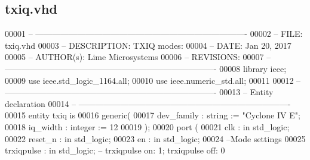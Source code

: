 \subsection{txiq.\+vhd}
\label{txiq_8vhd_source}

\begin{DoxyCode}
00001 \textcolor{keyword}{-- ---------------------------------------------------------------------------- }
00002 \textcolor{keyword}{-- FILE:    txiq.vhd}
00003 \textcolor{keyword}{-- DESCRIPTION: TXIQ modes: }
00004 \textcolor{keyword}{-- DATE:    Jan 20, 2017}
00005 \textcolor{keyword}{-- AUTHOR(s):   Lime Microsystems}
00006 \textcolor{keyword}{-- REVISIONS:}
00007 \textcolor{keyword}{-- ---------------------------------------------------------------------------- }
00008 \textcolor{vhdlkeyword}{library }\textcolor{keywordflow}{ieee};
00009 \textcolor{vhdlkeyword}{use }ieee.std\_logic\_1164.\textcolor{keywordflow}{all};
00010 \textcolor{vhdlkeyword}{use }ieee.numeric\_std.\textcolor{keywordflow}{all};
00011 
00012 \textcolor{keyword}{-- ----------------------------------------------------------------------------}
00013 \textcolor{keyword}{-- Entity declaration}
00014 \textcolor{keyword}{-- ----------------------------------------------------------------------------}
00015 \textcolor{keywordflow}{entity }txiq \textcolor{keywordflow}{is}
00016    \textcolor{keywordflow}{generic}\textcolor{vhdlchar}{(} 
00017       \textcolor{vhdlchar}{dev_family}    \textcolor{vhdlchar}{:} \textcolor{comment}{string} \textcolor{vhdlchar}{:=} \textcolor{keyword}{"Cyclone IV E"};
00018       \textcolor{vhdlchar}{iq_width}      \textcolor{vhdlchar}{:} \textcolor{comment}{integer} \textcolor{vhdlchar}{:=} \textcolor{vhdllogic}{}\textcolor{vhdllogic}{12}
00019    \textcolor{vhdlchar}{)};
00020    \textcolor{keywordflow}{port} \textcolor{vhdlchar}{(}
00021       \textcolor{vhdlchar}{clk}         \textcolor{vhdlchar}{:} \textcolor{keywordflow}{in} \textcolor{comment}{std\_logic};
00022       \textcolor{vhdlchar}{reset_n}     \textcolor{vhdlchar}{:} \textcolor{keywordflow}{in} \textcolor{comment}{std\_logic};
00023       \textcolor{vhdlchar}{en}          \textcolor{vhdlchar}{:} \textcolor{keywordflow}{in} \textcolor{comment}{std\_logic};
00024 \textcolor{keyword}{      --Mode settings}
00025       \textcolor{vhdlchar}{trxiqpulse}    \textcolor{vhdlchar}{:} \textcolor{keywordflow}{in} \textcolor{comment}{std\_logic};\textcolor{keyword}{ -- trxiqpulse on: 1; trxiqpulse off: 0}

\end{DoxyCode}
